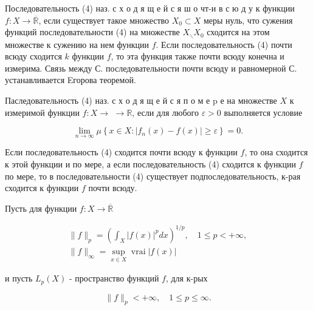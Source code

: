 \documentclass[10pt]{article}
\begin{document}
Последовательность (4) наз. с х о д я щ е й с я ш о чт-и в с ю д у к функции $f: X \rightarrow \overline{\mathbb{R}}$, если существует такое множество $X_{0} \subset X$ меры нуль, что сужения функций последовательности (4) на множестве $X_{\backslash} X_{0}$ сходится на этом множестве к сужению на нем функции $f$. Если последовательность (4) почти всюду сходится $k$ функции $f$, то эта функция также почти всюду конечна и измерима. Связь между С. последовательности почти всюду и равномерной С. устанавливается Eгорова теоремой.



Паследовательность (4) наз. с х о д я щ е й с я п о м е $\mathrm{p}$ е на множестве $X$ к измеримой функции $f: X \rightarrow$ $\rightarrow \mathbb{R}$, если для любого $\varepsilon>0$ выполняется условие



\[

\lim _{n \rightarrow \infty} \mu\left\{x \in X:\left|f_{n}(x)-f(x)\right| \geqslant \varepsilon\right\}=0 .

\]



Если последовательность (4) сходится почти всюду к функции $f$, то она сходится к этой функции и по мере, а если последовательность (4) сходится к функции $f$ по мере, то в последовательности (4) существует подпоследовательность, к-рая сходится к функции $f$ почти всюду.



Пусть для функции $f: X \rightarrow \overline{\mathbb{R}}$



\[

\begin{gathered}

\|f\|_{p}=\left(\int_{X}|f(x)|^{p} d x\right)^{1 / p}, \quad 1 \leqslant p<+\infty, \\

\|f\|_{\infty}=\sup _{x \in X} \operatorname{vrai}|f(x)|

\end{gathered}

\]



и пусть $L_{p}(X)$ - пространство функций $f$, для к-рых



\[

\|f\|_{p}<+\infty, \quad 1 \leqslant p \leqslant \infty .

\]
\end{document}
